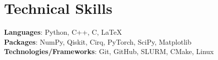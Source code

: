 \documentclass[letterpaper,11pt]{article}
\newcommand{\resumeItem}[1]{
  \item\small{
    {#1 \vspace{-2pt}}
  }
}
\newcommand{\resumeItemListStart}{\begin{itemize}}
\newcommand{\resumeItemListEnd}{\end{itemize}\vspace{-5pt}}
\begin{document}
%
\section{Technical Skills}
 \begin{itemize}[leftmargin=0.15in, label={}]
    \small{\item{
     \textbf{Languages}{: Python, C++, C, \LaTeX} \\
     \textbf{Packages}{: NumPy, Qiskit, Cirq, PyTorch, SciPy, Matplotlib} \\
     \textbf{Technologies/Frameworks}{: Git, GitHub, SLURM, CMake, Linux} \\
    }}
 \end{itemize}
 \vspace{-16pt}


    

\end{document}
